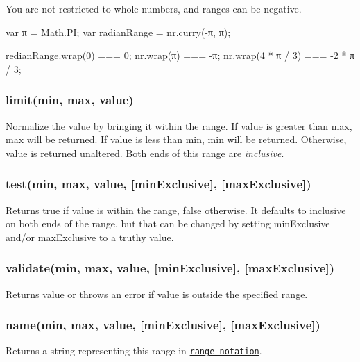 You are not restricted to whole numbers, and ranges can be negative.


\begin{DoxyCode}
var π = Math.PI;
var radianRange = nr.curry(-π, π);

redianRange.wrap(0) === 0;
nr.wrap(π) === -π;
nr.wrap(4 * π / 3) === -2 * π / 3;
\end{DoxyCode}


\subsubsection*{limit(min, max, value)}

Normalize the value by bringing it within the range. If {\ttfamily value} is greater than {\ttfamily max}, {\ttfamily max} will be returned. If {\ttfamily value} is less than {\ttfamily min}, {\ttfamily min} will be returned. Otherwise, {\ttfamily value} is returned unaltered. Both ends of this range are {\itshape inclusive}.

\subsubsection*{test(min, max, value, \mbox{[}min\+Exclusive\mbox{]}, \mbox{[}max\+Exclusive\mbox{]})}

Returns {\ttfamily true} if {\ttfamily value} is within the range, {\ttfamily false} otherwise. It defaults to {\ttfamily inclusive} on both ends of the range, but that can be changed by setting {\ttfamily min\+Exclusive} and/or {\ttfamily max\+Exclusive} to a truthy value.

\subsubsection*{validate(min, max, value, \mbox{[}min\+Exclusive\mbox{]}, \mbox{[}max\+Exclusive\mbox{]})}

Returns {\ttfamily value} or throws an error if {\ttfamily value} is outside the specified range.

\subsubsection*{name(min, max, value, \mbox{[}min\+Exclusive\mbox{]}, \mbox{[}max\+Exclusive\mbox{]})}

Returns a string representing this range in \href{https://en.wikipedia.org/wiki/Interval_(mathematics)#Classification_of_intervals}{\tt range notation}.

